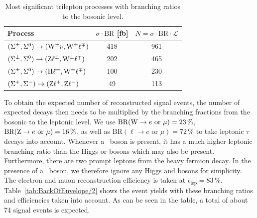 \begin{table}
\centering
\caption{Most significant trilepton processes with branching ratios to the bosonic level.} \label{tab:BackOfEnvelope/1}
\begin{tabular}{lcc}
\hline\hline
Process                                                       & $\sigma \cdot \textrm{BR}$ [fb] & $N = \sigma \cdot \textrm{BR} \cdot \mathcal{L}$ \\
\hline
$(\Sigma^\pm, \Sigma^0) \to (\mathrm{W}^\pm \nu, \mathrm{W}^\pm \ell^\mp)$  & 418                             & 961 \\
$(\Sigma^\pm, \Sigma^0) \to (\mathrm{Z} \ell^\pm, \mathrm{W}^\pm \ell^\mp)$  & 202                             & 465 \\
$(\Sigma^\pm, \Sigma^0) \to (\mathrm{H} \ell^\pm, \mathrm{W}^\pm \ell^\mp)$ & 100                             & 230 \\
$(\Sigma^+, \Sigma^-) \to (\mathrm{Z} \ell^+, \mathrm{Z} \ell^-)$             & 49                              & 113 \\
\end{tabular}
\end{table}

To obtain the expected number of reconstructed signal events, the number of expected decays then needs to be multiplied by the branching fractions from the bosonic to the leptonic level. We use $\textrm{BR}(\mathrm{W} \to e \text{ or } \mu) = 23\,\%$, $\textrm{BR}(\mathrm{Z} \to e \text{ or } \mu) = 16\,\%$, as well as $\textrm{BR}(\ell\to e \text{ or } \mu) = 72\,\%$ to take leptonic $\tau$ decays into account. Whenever a \PW\ boson is present, it has a much higher leptonic branching ratio than the Higgs or \Z bosons which may also be present. Furthermore, there are two prompt leptons from the heavy fermion decay. In the presence of a \PW\ boson, we therefore ignore any Higgs and \Z bosons for simplicity. The electron and muon reconstruction efficiency is taken at $\epsilon_\textrm{lep} = 83\,\%$. Table~\ref{tab:BackOfEnvelope/2} shows the event yields with these branching ratios and efficiencies taken into account. As can be seen in the table, a total of about 74 signal events is expected. 

